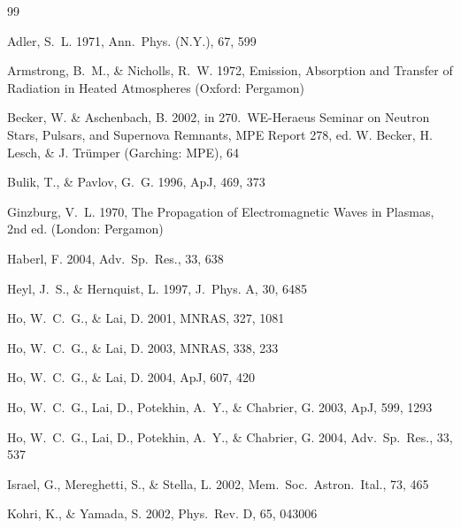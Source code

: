\documentclass{emulateapj}
\begin{document}

\begin{thebibliography}{99}

Adler, S.~L. 1971,
Ann.\ Phys. (N.Y.), 67, 599

Armstrong, B.~M., \& Nicholls, R.~W. 1972,
Emission, Absorption and Transfer of Radiation in Heated Atmospheres
(Oxford: Pergamon)

Becker, W. \& Aschenbach, B. 2002,
in 270.\ WE-Heraeus Seminar on Neutron Stars, Pulsars, and Supernova
 Remnants, MPE Report 278, ed. W. Becker, H. Lesch, \& J. Tr\"umper
 (Garching: MPE), 64%

Bulik, T., \& Pavlov, G.~G. 1996,
ApJ, 469, 373

Ginzburg, V.~L. 1970,
The Propagation of Electromagnetic Waves in Plasmas,
2nd ed. (London: Pergamon)

Haberl, F. 2004,
Adv.\ Sp.\ Res., 33, 638%

Heyl, J.~S., \& Hernquist, L. 1997,
J.\ Phys. A, 30, 6485

Ho, W.~C.~G., \& Lai, D. 2001,
MNRAS, 327, 1081

Ho, W.~C.~G., \& Lai, D. 2003,
MNRAS, 338, 233

 Ho, W.~C.~G., \& Lai, D. 2004,
ApJ, 607, 420

Ho, W.~C.~G., Lai, D., Potekhin, A.~Y., \& Chabrier, G. 2003,
ApJ, 599, 1293

Ho, W.~C.~G., Lai, D., Potekhin, A.~Y., \& Chabrier, G. 2004,
Adv.\ Sp.\ Res., 33, 537

Israel, G., Mereghetti, S., \& Stella, L. 2002,
Mem.\ Soc.\ Astron.\ Ital., 73, 465 %

Kohri, K., \& Yamada, S. 2002,
Phys.\ Rev. D, 65, 043006


\end{thebibliography}
\end{document}
